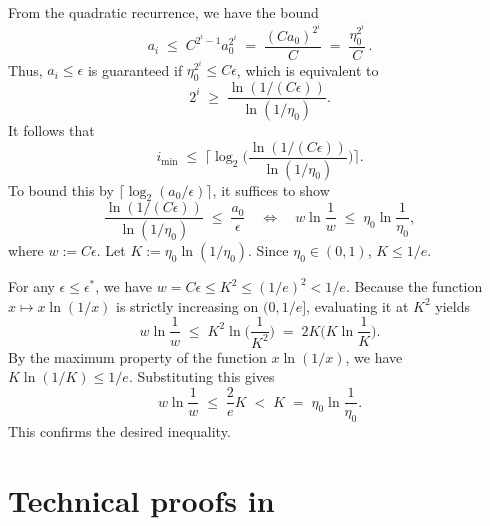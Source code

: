 \documentclass[moor,sglanonrev]{informs4}
\begin{document}
\begin{APPENDICES}
{        
        From the quadratic recurrence, we have the bound
        \[
            a_i \;\le\; C^{2^{i}-1} a_0^{2^{i}} \;=\; \frac{(C a_0)^{2^{i}}}{C} \;=\; \frac{\eta_0^{2^{i}}}{C}\,.
        \]
        Thus, $a_i\le\epsilon$ is guaranteed if $\eta_0^{2^{i}}\le C\epsilon$, which is equivalent to
        \[
            2^{i} \;\ge\; \frac{\ln(1/(C\epsilon))}{\ln(1/\eta_0)}.
        \]
        It follows that
        \[
            i_{\min}\;\le\;\Big\lceil \log_2\!\Big(\frac{\ln(1/(C\epsilon))}{\ln(1/\eta_0)}\Big)\Big\rceil.
        \]
        To bound this by $\lceil \log_2(a_0/\epsilon) \rceil$, it suffices to show
        \[
            \frac{\ln(1/(C\epsilon))}{\ln(1/\eta_0)} \;\le\; \frac{a_0}{\epsilon} \quad\Longleftrightarrow\quad w\ln\!\frac{1}{w}\;\le\;\eta_0\ln\!\frac{1}{\eta_0},
        \]
        where $w := C\epsilon$. Let $K := \eta_0\ln(1/\eta_0)$. Since $\eta_0 \in (0, 1)$, $K \le 1/e$.

        For any $\epsilon \le \epsilon^*$, we have $w = C\epsilon \le K^2 \le (1/e)^2 < 1/e$. Because the function $x \mapsto x\ln(1/x)$ is strictly increasing on $(0, 1/e]$, evaluating it at $K^2$ yields
        \[
            w\ln\!\frac{1}{w} \;\le\; K^2 \ln\!\Big(\frac{1}{K^2}\Big) \;=\; 2K \Big(K\ln\!\frac{1}{K}\Big).
        \]
        By the maximum property of the function $x\ln(1/x)$, we have $K\ln(1/K) \le 1/e$. Substituting this gives
        \[
            w\ln\!\frac{1}{w} \;\le\; \frac{2}{e}K \;<\; K \;=\; \eta_0\ln\!\frac{1}{\eta_0}.
        \]
        This confirms the desired inequality.
        \Halmos \endproof
    }
    \section{Technical proofs in~}\label{sec.appendix 2}

\end{APPENDICES}
\end{document}
